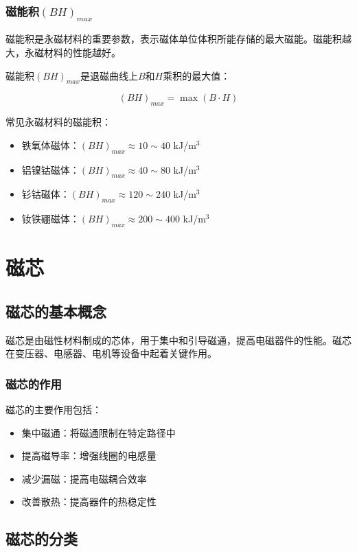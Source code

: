 \documentclass[12pt,UTF8]{ctexbook}
\begin{document}
\subsection{磁能积$(BH)_{max}$}

磁能积是永磁材料的重要参数，表示磁体单位体积所能存储的最大磁能。磁能积越大，永磁材料的性能越好。

磁能积$(BH)_{max}$是退磁曲线上$B$和$H$乘积的最大值：

$$ (BH)_{max} = \max(B \cdot H) $$

常见永磁材料的磁能积：

\begin{itemize}[leftmargin=2cm]
    \item 铁氧体磁体：$(BH)_{max} \approx 10 \sim 40$ kJ/m$^3$
    \item 铝镍钴磁体：$(BH)_{max} \approx 40 \sim 80$ kJ/m$^3$
    \item 钐钴磁体：$(BH)_{max} \approx 120 \sim 240$ kJ/m$^3$
    \item 钕铁硼磁体：$(BH)_{max} \approx 200 \sim 400$ kJ/m$^3$
\end{itemize}

\chapter{磁芯}

\section{磁芯的基本概念}

磁芯是由磁性材料制成的芯体，用于集中和引导磁通，提高电磁器件的性能。磁芯在变压器、电感器、电机等设备中起着关键作用。

\subsection{磁芯的作用}

磁芯的主要作用包括：

\begin{itemize}[leftmargin=2cm]
    \item 集中磁通：将磁通限制在特定路径中
    \item 提高磁导率：增强线圈的电感量
    \item 减少漏磁：提高电磁耦合效率
    \item 改善散热：提高器件的热稳定性
\end{itemize}

\section{磁芯的分类}
\end{document}

